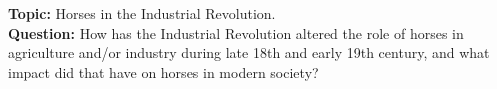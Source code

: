 \textbf{Topic: } Horses in the Industrial Revolution. \\

\textbf{Question: } How has the Industrial Revolution altered the role of horses in agriculture and/or industry during late 18th and early 19th century, and what impact did that have on horses in modern society? \\
